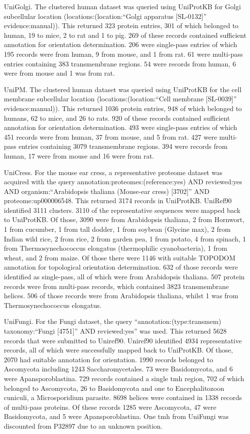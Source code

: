 UniGolgi.
The clustered human dataset was queried using UniProtKB for Golgi subcellular location (locations:(location:``Golgi apparatus [SL-0132]'' evidence:manual)).
This returned 323 protein entries, 301 of which belonged to human, 19 to mice, 2 to rat and 1 to pig.
269 of these records contained sufficient annotation for orientation determination.
206 were single-pass entries of which 195 records were from human, 9 from mouse, and 1 from rat.
61 were multi-pass entries containing 383 transmembrane regions.
54 were records from human, 6 were from mouse and 1 was from rat.

UniPM.
The clustered human dataset was queried using UniProtKB for the cell membrane subcellular location (locations:(location:``Cell membrane [SL-0039]'' evidence:manual)).
This returned 1036 protein entries, 948 of which belonged to humans, 62 to mice, and 26 to rats.
920 of these records contained sufficient annotation for orientation determination.
493 were single-pass entries of which 451 records were from human, 37 from mouse, and 5 from rat.
427 were multi-pass entries containing 3079 transmembrane regions.
394 were records from human, 17 were from mouse and 16 were from rat.

UniCress.
For the mouse ear cress, a representative proteome dataset was acquired with the query annotation:proteomes:(reference:yes) AND reviewed:yes AND organism:``Arabidopsis thaliana (Mouse-ear cress) [3702]'' AND proteome:up000006548.
This returned 3174 records in UniProtKB.
UniRef90 identified 3111 clusters.
3110 of the representative sequences were mapped back to UniProtKB.
Of those, 3090 were from Arabidopsis thaliana, 2 from Hornwort, 1 from cucumber, 1 from tall dodder, 1 from soybean (Glycine max), 2 from Indian wild rice, 2 from rice, 2 from garden pea, 1 from potato, 4 from spinach, 1 from Thermosynechococcus elongatus (thermophilic cyanobacteria), 1 from wheat, and 2 from maize.
Of those there were 1146 with suitable TOPO\textunderscore DOM annotation for topological orientation determination.
632 of those records were identified as single-pass, all of which were from Arabidopsis thaliana.
507 protein records were from multi-pass records, which contained 3823 transmembrane helices.
506 of those records were from Arabidopsis thaliana, whilst 1 was from Thermosynechococcus elongatus.

UniFungi.
For the Fungi dataset, the query ``annotation:(type:transmem) taxonomy:``Fungi [4751]'' AND reviewed:yes'' was used.
This returned 5628 records that were submitted to Uniref90.
Uniref90 identified 4934 representative records, all of which were successfully mapped back to UniProtKB.
Of those, 2070 had suitable annotation for orientation.
1990 records belonged to Ascomycota including 1243 Saccharomycetales.
73 were Basidomycota, and 6 were Apansporoblastina.
729 records contained a single \gls{tmh} region, 702 of which belonged to Ascomycota, 26 to Basidomycota and one to Encephalitozoon cuniculi, a Microsporidium parasite.
8698 helices were contained in 1338 records of multi-pass proteins.
Of these records 1285 were Ascomycota, 47 were Basidomycota, and 5 were Apansporoblastina.
One \gls{tmh} from UniFungi was discounted from P32897 due to an unknown position.


